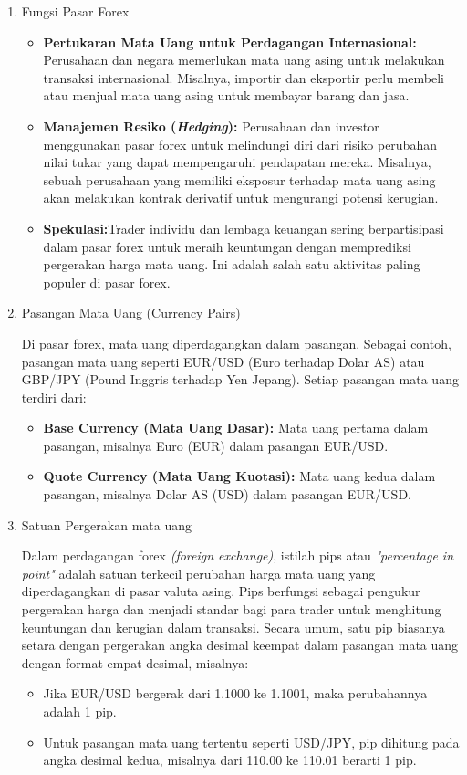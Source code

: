 \begin{enumerate}
    \item Fungsi Pasar Forex
    \begin{itemize}
        \item \textbf{Pertukaran Mata Uang untuk Perdagangan Internasional:} Perusahaan dan negara memerlukan mata uang asing untuk melakukan transaksi internasional. Misalnya, importir dan eksportir perlu membeli atau menjual mata uang asing untuk membayar barang dan jasa.
        \item \textbf{Manajemen Resiko (\textit{Hedging}):} Perusahaan dan investor menggunakan pasar forex untuk melindungi diri dari risiko perubahan nilai tukar yang dapat mempengaruhi pendapatan mereka. Misalnya, sebuah perusahaan yang memiliki eksposur terhadap mata uang asing akan melakukan kontrak derivatif untuk mengurangi potensi kerugian.
        \item \textbf{Spekulasi:}Trader individu dan lembaga keuangan sering berpartisipasi dalam pasar forex untuk meraih keuntungan dengan memprediksi pergerakan harga mata uang. Ini adalah salah satu aktivitas paling populer di pasar forex.
    \end{itemize}
    \item Pasangan Mata Uang (Currency Pairs)
    
    Di pasar forex, mata uang diperdagangkan dalam pasangan. Sebagai contoh, pasangan mata uang seperti EUR/USD (Euro terhadap Dolar AS) atau GBP/JPY (Pound Inggris terhadap Yen Jepang). Setiap pasangan mata uang terdiri dari:
    \begin{itemize}
        \item \textbf{Base Currency (Mata Uang Dasar):} Mata uang pertama dalam pasangan, misalnya Euro (EUR) dalam pasangan EUR/USD.
        \item \textbf{Quote Currency (Mata Uang Kuotasi):} Mata uang kedua dalam pasangan, misalnya Dolar AS (USD) dalam pasangan EUR/USD.
    \end{itemize}
    
    \item Satuan Pergerakan mata uang
    
    Dalam perdagangan forex \textit{(foreign exchange)}, istilah pips atau \textit{"percentage in point"} adalah satuan terkecil perubahan harga mata uang yang diperdagangkan di pasar valuta asing. Pips berfungsi sebagai pengukur pergerakan harga dan menjadi standar bagi para trader untuk menghitung keuntungan dan kerugian dalam transaksi.
    Secara umum, satu pip biasanya setara dengan pergerakan angka desimal keempat dalam pasangan mata uang dengan format empat desimal, misalnya:
    \begin{itemize}
        \item Jika EUR/USD bergerak dari 1.1000 ke 1.1001, maka perubahannya adalah 1 pip.
        \item Untuk pasangan mata uang tertentu seperti USD/JPY, pip dihitung pada angka desimal kedua, misalnya dari 110.00 ke 110.01 berarti 1 pip.
    \end{itemize}
\end{enumerate}
